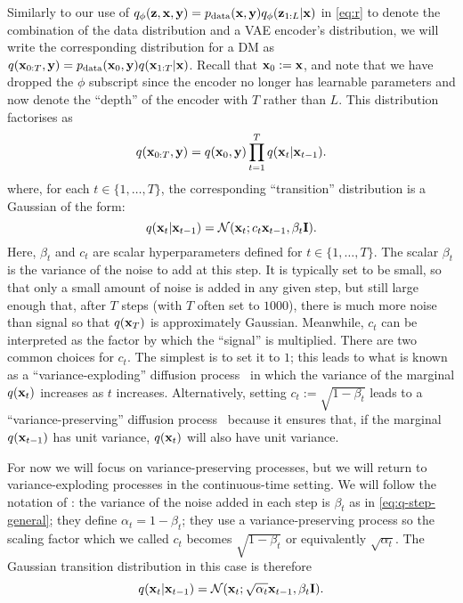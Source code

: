 Similarly to our use of $q_\phi({\mathbf{z}}, {\mathbf{x}},{\mathbf{y}})=p_{\rm{data}}({\mathbf{x}},{\mathbf{y}})q_\phi({\mathbf{z}}_{1:L}|{\mathbf{x}})$ in \cref{eq:r} to denote the combination of the data distribution and a VAE encoder's distribution, we will write the corresponding distribution for a DM as $q({\mathbf{x}}_{0:T},{\mathbf{y}}) = p_{\rm{data}}({\mathbf{x}}_0,{\mathbf{y}}) q({\mathbf{x}}_{1:T}|{\mathbf{x}})$. Recall that ${\mathbf{x}}_0 := {\mathbf{x}}$, and note that we have dropped the $\phi$ subscript since the encoder no longer has learnable parameters and now denote the ``depth'' of the encoder with $T$ rather than $L$. This distribution factorises as 
\begin{equation} \label{eq:q-joint}
    q({\mathbf{x}}_{0:T}, {\mathbf{y}}) = q({\mathbf{x}}_0, {\mathbf{y}}) \prod_{t=1}^T q({\mathbf{x}}_t|{\mathbf{x}}_{t-1}).
\end{equation}
where, for each $t \in \{1, \ldots, T\}$, the corresponding ``transition'' distribution is a Gaussian of the form:
\begin{equation} \label{eq:q-step-general}
    q({\mathbf{x}}_t | {\mathbf{x}}_{t-1}) = {\mathcal{N}}({\mathbf{x}}_t ; c_t  {\mathbf{x}}_{t-1} , \beta_t {\mathbf{I}} ).
\end{equation}
Here, $\beta_t$ and $c_t$ are scalar hyperparameters defined for $t \in \{1, \ldots, T\}$. The scalar $\beta_t$ is the variance of the noise to add at this step. It is typically set to be small, so that only a small amount of noise is added in any given step, but still large enough that, after $T$ steps (with $T$ often set to $1000$), there is much more noise than signal so that $q({\mathbf{x}}_T)$ is approximately Gaussian. Meanwhile, $c_t$ can be interpreted as the factor by which the ``signal'' is multiplied. There are two common choices for $c_t$. The simplest is to set it to $1$; this leads to what is known as a ``variance-exploding'' diffusion process~\citep{song2020score} in which the variance of the marginal $q({\mathbf{x}}_t)$ increases as $t$ increases. Alternatively, setting $c_t := \sqrt{1-\beta_t}$ leads to a ``variance-preserving'' diffusion process~\citep{song2020score} because it ensures that, if the marginal $q({\mathbf{x}}_{t-1})$ has unit variance, $q({\mathbf{x}}_t)$ will also have unit variance.

For now we will focus on variance-preserving processes, but we will return to variance-exploding processes in the continuous-time setting. We will follow the notation of \citet{nichol2021improved}: the variance of the noise added in each step is $\beta_t$ as in \cref{eq:q-step-general}; they define $\alpha_t = 1-\beta_t$; they use a variance-preserving process so the scaling factor which we called $c_t$ becomes $\sqrt{1-\beta_t}$ or equivalently $\sqrt{\alpha_t}$. The Gaussian transition distribution in this case is therefore
\begin{equation} \label{eq:q-step-iddpm}
    q({\mathbf{x}}_t | {\mathbf{x}}_{t-1}) = {\mathcal{N}}({\mathbf{x}}_t ; \sqrt{\alpha_t}  {\mathbf{x}}_{t-1} , \beta_t {\mathbf{I}} ).
\end{equation}

